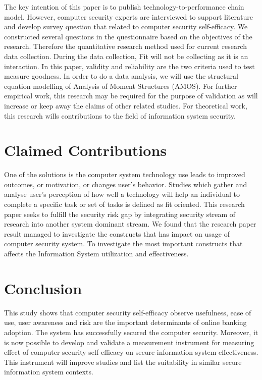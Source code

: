 \documentclass[a4paper, 12pt]{article}
\begin{document}
The key intention of this paper is to publish technology-to-performance chain model. However, computer security experts are interviewed to support literature and develop survey question that related to computer security self-efficacy. We constructed several questions in the questionnaire based on the objectives of the research. Therefore the quantitative research method used for current research data collection. During the data collection, Fit will not be collecting as it is an interaction. In this paper, validity and reliability are the two criteria used to test measure goodness. In order to do a data analysis, we will use the structural equation modelling of Analysis of Moment Structures (AMOS).
For further empirical work, this research may be required for the purpose of validation as will increase or keep away the claims of other related studies. For theoretical work, this research wills contributions to the field of information system security.

\section{Claimed Contributions}

One of the solutions is the computer system technology use leads to improved outcomes, or motivation, or changes user’s behavior. Studies which gather and analyse user’s perception of how well a technology will help an individual to complete a specific task or set of tasks is defined as fit oriented. This research paper seeks to fulfill the security risk gap by integrating security stream of research into another system dominant stream. We found that the research paper result managed to investigate the constructs that has impact on usage of computer security system. To investigate the most important constructs that affects the Information System utilization and effectiveness.

\section{Conclusion}

This study shows that computer security self-efficacy observe usefulness, ease of use, user awareness and risk are the important determinants of online banking adoption. The system has successfully secured the computer security. Moreover, it is now possible to develop and validate a measurement instrument for measuring effect of computer security self-efficacy on secure information system effectiveness. This instrument will improve studies and list the suitability in similar secure information system contexts. 
\end{document}
